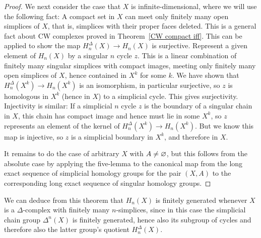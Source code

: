 \begin{proof}
We next consider the case that $X$ is infinite-dimensional, where we will use the following fact: A compact set in $X$ can meet only finitely many open simplices of $X$, that is, simplices with their proper faces deleted. This is a general fact about CW complexes proved in Theorem~\ref{CW compact iff}. This can be applied to show the map $H^\Delta_n(X)\to H_n(X)$ is surjective.  Represent a given element of $H_n(X)$ by a singular $n$ cycle $z$. This is a linear combination of finitely many singular simplices with compact images, meeting only finitely many open simplices of $X$, hence contained in $X^k$ for some $k$. We have shown that $H^\Delta_n(X^k)\to H_n(X^k)$ is an isomorphism, in particular surjective, so $z$ is homologous in $X^k$ (hence in $X$) to a simplicial cycle. This gives surjectivity. Injectivity is similar: If a simplicial $n$ cycle $z$ is the boundary of a singular chain in $X$, this chain has compact image and hence must lie in some $X^k$, so $z$ represents an element of the kernel of $H^\Delta_n(X^k)\to H_n(X^k)$. But we know this map is injective, so $z$ is a simplicial boundary in $X^k$, and therefore in $X$.\par
It remains to do the case of arbitrary $X$ with $A\neq\varnothing$, but this follows from the absolute case by applying the five-lemma to the canonical map from the long exact sequence of simplicial homology groups for the pair $(X,A)$ to the corresponding long exact sequence of singular homology groups.
\end{proof}
We can deduce from this theorem that $H_n(X)$ is finitely generated whenever $X$
is a $\Delta$-complex with finitely many $n$-simplices, since in this case the simplicial chain group $\Delta^n(X)$ is finitely generated, hence also its subgroup of cycles and therefore also the latter group's quotient $H^\Delta_n(X)$.
